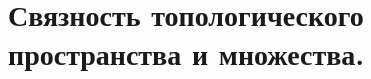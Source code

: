\documentclass[geometry.tex]{subfiles}
\begin{document}
  \section{Связность топологического пространства и множества.}
\end{document}
